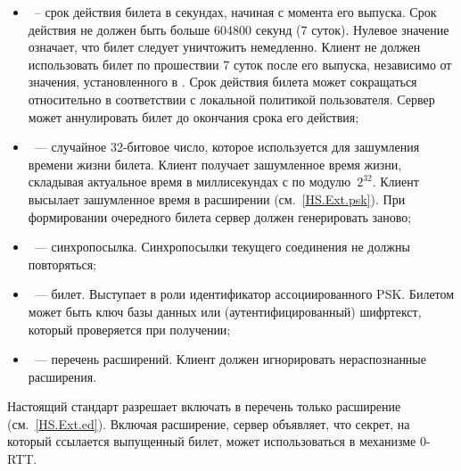 \begin{itemize}
\item
{}~-- срок действия билета в секундах, начиная с момента 
его выпуска.
%
%
Срок действия не должен быть больше 604800 секунд (7 суток). Нулевое значение
 означает, что билет следует уничтожить немедленно.
%
% 
Клиент не должен использовать билет по прошествии 7 суток после его выпуска,
независимо от значения, установленного в .
%
Срок действия билета может сокращаться относительно 
в соответствии с локальной политикой пользователя.
%
Сервер может аннулировать билет до окончания срока его действия; 


\item
{}~--- случайное 32-битовое число, которое используется для 
зашумления времени жизни билета. Клиент получает зашумленное время жизни, 
складывая актуальное время в миллисекундах с  по 
модулю~$2^{32}$. Клиент высылает зашумленное время в расширении 
 (см.~\ref{HS.Ext.psk}). При формировании  
очередного билета сервер должен генерировать  заново;

\item
{}~--- синхропосылка. Синхропосылки текущего соединения не 
должны повторяться;

\item
{}~--- билет. Выступает в роли идентификатор ассоциированного PSK. 
Билетом может быть ключ базы данных или (аутентифицированный) шифртекст, 
который проверяется при получении;


\item
{}~--- перечень расширений. Клиент должен игнорировать 
нераспознанные расширения.
\end{itemize}

Настоящий стандарт разрешает включать в перечень
 только расширение 
 (см.~\ref{HS.Ext.ed}). Включая расширение, сервер 
объявляет, что секрет, на который ссылается выпущенный билет, может 
использоваться в механизме \mbox{0-RTT}.

